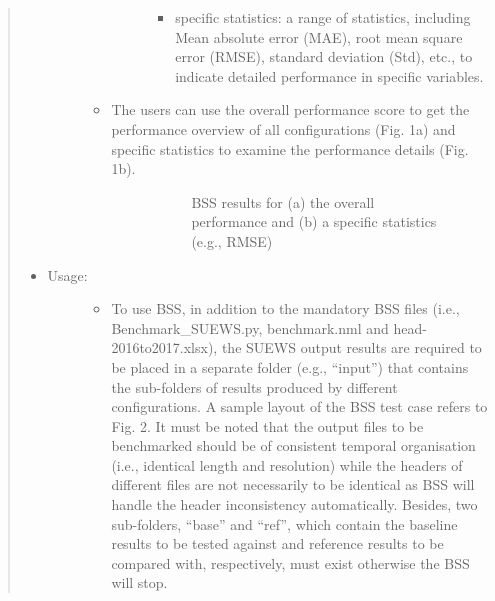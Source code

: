 \documentclass[letterpaper,10pt,english]{sphinxmanual}
\begin{document}
\begin{quote}
\begin{itemize}
\begin{description}
\begin{itemize}
\begin{description}
\begin{itemize}
\item {} 
specific statistics: a range of statistics, including Mean absolute error (MAE), root mean square error (RMSE), standard deviation (Std), etc., to indicate detailed performance in specific variables.

\end{itemize}

\end{description}

\item {} \begin{description}
\item[{The users can use the overall performance score to get the performance overview of all configurations (Fig. 1a) and specific statistics to examine the performance details (Fig. 1b).}] \leavevmode
\begin{figure}[htbp]
\centering
\capstart

\noindent{}
\caption{BSS results for (a) the overall performance and (b) a specific statistics (e.g., RMSE)}\label{\detokenize{post_processor/Benchmark System:id1}}\end{figure}

\end{description}

\end{itemize}

\end{description}

\item {} \begin{description}
\item[{Usage:}] \leavevmode\begin{itemize}
\item {} 
To use BSS, in addition to the mandatory BSS files (i.e., Benchmark\_SUEWS.py, benchmark.nml and head-2016to2017.xlsx), the SUEWS output results are required to be placed in a separate folder (e.g., “input”) that contains the sub-folders of results produced by different configurations. A sample layout of the BSS test case refers to Fig. 2. It must be noted that the output files to be benchmarked should be of consistent temporal organisation (i.e., identical length and resolution) while the headers of different files are not necessarily to be identical as BSS will handle the header inconsistency automatically. Besides, two sub-folders, “base” and “ref”, which contain the baseline results to be tested against and reference results to be compared with, respectively, must exist otherwise the BSS will stop.   \textbar{}


\end{itemize}
\end{description}
\end{itemize}
\end{quote}
\end{document}
